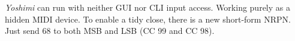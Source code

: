 \begin{table}[H]
\begin{tabular}{r l l}
      \end{tabular}
   \end{table}

   \textsl{Yoshimi} can run with neither GUI nor CLI input access. Working
   purely as a hidden MIDI device. To enable a tidy close, there is a new
   short-form NRPN. Just send 68 to both MSB and LSB (CC 99 and CC 98).

